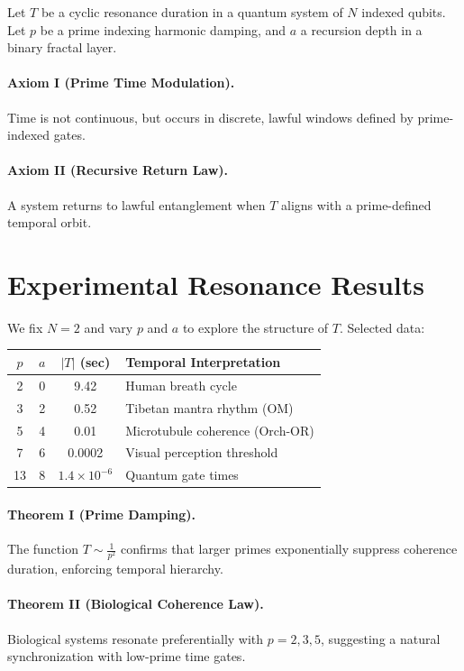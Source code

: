 \documentclass[12]{amsart}
\theoremstyle{plain}
\begin{document}
Let $T$ be a cyclic resonance duration in a quantum system of $N$ indexed qubits. Let $p$ be a prime indexing harmonic damping, and $a$ a recursion depth in a binary fractal layer.

\paragraph{Axiom I (Prime Time Modulation).} Time is not continuous, but occurs in discrete, lawful windows defined by prime-indexed gates.

\paragraph{Axiom II (Recursive Return Law).} A system returns to lawful entanglement when $T$ aligns with a prime-defined temporal orbit.

\section{Experimental Resonance Results}

We fix $N=2$ and vary $p$ and $a$ to explore the structure of $T$. Selected data:

\begin{center}
\begin{tabular}{|c|c|c|l|}
\hline
$p$ & $a$ & $|T|$ (sec) & Temporal Interpretation \\
\hline
2 & 0 & 9.42 & Human breath cycle \\
3 & 2 & 0.52 & Tibetan mantra rhythm (OM) \\
5 & 4 & 0.01 & Microtubule coherence (Orch-OR) \\
7 & 6 & 0.0002 & Visual perception threshold \\
13 & 8 & $1.4 \times 10^{-6}$ & Quantum gate times \\
\hline
\end{tabular}
\end{center}

\paragraph{Theorem I (Prime Damping).} The function $T \sim \frac{1}{p^2}$ confirms that larger primes exponentially suppress coherence duration, enforcing temporal hierarchy.

\paragraph{Theorem II (Biological Coherence Law).} Biological systems resonate preferentially with $p=2,3,5$, suggesting a natural synchronization with low-prime time gates.
\end{document}
